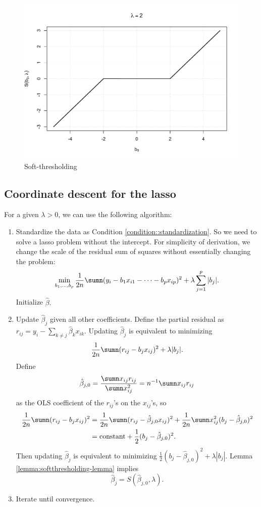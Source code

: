 \begin{figure}
\centering 
\includegraphics[scale=0.6]{figures/softthresholdingplot}

\caption{Soft-thresholding}\label{fig::soft-threshholding-function}

\end{figure}




\subsection{Coordinate descent for the lasso}

For a given $\lambda>0$, we can use the following algorithm: 
\begin{enumerate}
\item Standardize the data as Condition \ref{condition::standardization}. 
So we need to solve a lasso problem without the intercept. For simplicity
of derivation, we change the scale of the residual sum of squares
without essentially changing the problem:
\[
\min_{b_{1},\ldots,b_{p}}\frac{1}{2n}\sumn(y_{i} -b_{1}x_{i1}-\cdots-b_{p}x_{ip})^{2}+\lambda\sum_{j=1}^{p}|b_{j}|.
\]
Initialize $\hat{\beta}.$
\item Update $\hat{\beta}_{j}$ given all other coefficients. Define the
partial residual as $r_{ij}=y_{i}-\sum_{k\neq j}\hat{\beta}_{k} x_{ik}$.
Updating $\hat{\beta}_{j}$ is equivalent to minimizing
\[
\frac{1}{2n}\sumn(r_{ij}-b_{j}x_{ij})^{2}+\lambda|b_{j}|.
\]
Define 
\[
\hat{\beta}_{j,0}=\frac{\sumn x_{ij}r_{ij}}{\sumn x_{ij}^{2}}=n^{-1}\sumn x_{ij}r_{ij}
\]
as the OLS coefficient of the $r_{ij}$'s on the $x_{ij}$'s, so 
\begin{align*}
\frac{1}{2n}\sumn(r_{ij}-b_{j}x_{ij})^{2} & =\frac{1}{2n}\sumn(r_{ij}-\hat{\beta}_{j,0}x_{ij})^{2}+\frac{1}{2n}\sumn x_{ij}^{2}(b_{j}-\hat{\beta}_{j,0})^{2}\\
 & =\text{constant}+\frac{1}{2}(b_{j}-\hat{\beta}_{j,0})^{2}.
\end{align*}
Then updating $\hat{\beta}_{j}$ is equivalent to minimizing $\frac{1}{2}(b_{j}-\hat{\beta}_{j,0})^{2}+\lambda|b_{j}|$.
Lemma \ref{lemma:softthresholding-lemma} implies 
\[
\hat{\beta}_{j}=S(\hat{\beta}_{j,0},\lambda).
\]
\item Iterate until convergence. 
\end{enumerate}


